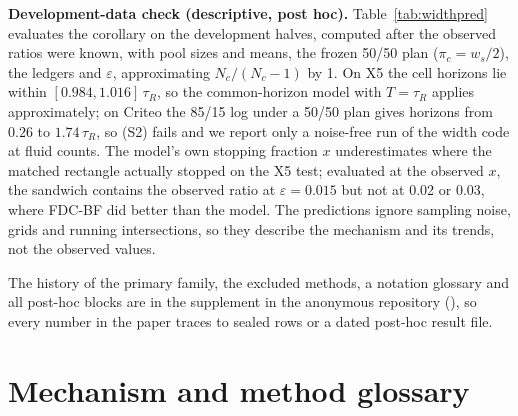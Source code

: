 \documentclass[sigconf,anonymous,review]{acmart}
\newcommand{\eps}{\varepsilon}
\begin{document}
\textbf{Development-data check (descriptive, post hoc).} Table~\ref{tab:widthpred} evaluates the corollary on the development halves, computed after the observed ratios were known, with pool sizes and means, the frozen 50/50 plan ($\pi_c = w_s/2$), the ledgers and $\eps$, approximating $N_c/(N_c-1)$ by 1. On X5 the cell horizons lie within $[0.984, 1.016]\,\tau_R$, so the common-horizon model with $T = \tau_R$ applies approximately; on Criteo the 85/15 log under a 50/50 plan gives horizons from $0.26$ to $1.74\,\tau_R$, so (S2) fails and we report only a noise-free run of the width code at fluid counts. The model's own stopping fraction $x$ underestimates where the matched rectangle actually stopped on the X5 test; evaluated at the observed $x$, the sandwich contains the observed ratio at $\eps = 0.015$ but not at 0.02 or 0.03, where FDC-BF did better than the model. The predictions ignore sampling noise, grids and running intersections, so they describe the mechanism and its trends, not the observed values.


The history of the primary family, the excluded methods, a notation glossary and all post-hoc blocks are in the supplement in the anonymous repository (\anonrepo), so every number in the paper traces to sealed rows or a dated post-hoc result file.

\section{Mechanism and method glossary}\label{app:rivals}
\end{document}
